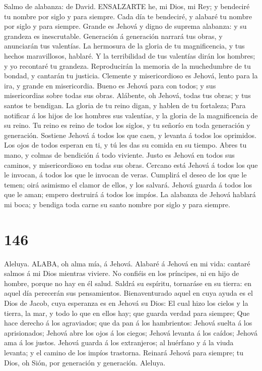  Salmo de alabanza: de David. ENSALZARTE he, mi Dios, mi
Rey; y bendeciré tu nombre por siglo y para siempre.  Cada
día te bendeciré, y alabaré tu nombre por siglo y para siempre.
 Grande es Jehová y digno de suprema alabanza: y su grandeza
es inescrutable.  Generación á generación narrará tus obras,
y anunciarán tus valentías.  La hermosura de la gloria de tu
magnificencia, y tus hechos maravillosos, hablaré.  Y la
terribilidad de tus valentías dirán los hombres; y yo recontaré tu
grandeza.  Reproducirán la memoria de la muchedumbre de tu
bondad, y cantarán tu justicia.  Clemente y misericordioso
es Jehová, lento para la ira, y grande en misericordia. 
Bueno es Jehová para con todos; y sus misericordias sobre todas sus
obras.  Alábente, oh Jehová, todas tus obras; y tus santos
te bendigan.  La gloria de tu reino digan, y hablen de tu
fortaleza;  Para notificar á los hijos de los hombres sus
valentías, y la gloria de la magnificencia de su reino.  Tu
reino es reino de todos los siglos, y tu señorío en toda generación y
generación.  Sostiene Jehová á todos los que caen, y
levanta á todos los oprimidos.  Los ojos de todos esperan
en ti, y tú les das su comida en su tiempo.  Abres tu mano,
y colmas de bendición á todo viviente.  Justo es Jehová en
todos sus caminos, y misericordioso en todas sus obras. 
Cercano está Jehová á todos los que le invocan, á todos los que le
invocan de veras.  Cumplirá el deseo de los que le temen;
oirá asimismo el clamor de ellos, y los salvará.  Jehová
guarda á todos los que le aman; empero destruirá á todos los impíos.
 La alabanza de Jehová hablará mi boca; y bendiga toda
carne su santo nombre por siglo y para siempre.

\hypertarget{section-145}{%
\section{146}\label{section-145}}

 Aleluya. ALABA, oh alma mía, á Jehová.  Alabaré
á Jehová en mi vida: cantaré salmos á mi Dios mientras viviere.
 No confiéis en los príncipes, ni en hijo de hombre, porque
no hay en él salud.  Saldrá su espíritu, tornaráse en su
tierra: en aquel día perecerán sus pensamientos. 
Bienaventurado aquel en cuya ayuda es el Dios de Jacob, cuya esperanza
es en Jehová su Dios:  El cual hizo los cielos y la tierra,
la mar, y todo lo que en ellos hay; que guarda verdad para siempre;
 Que hace derecho á los agraviados; que da pan á los
hambrientos: Jehová suelta á los aprisionados;  Jehová abre
los ojos á los ciegos; Jehová levanta á los caídos; Jehová ama á los
justos.  Jehová guarda á los extranjeros; al huérfano y á la
viuda levanta; y el camino de los impíos trastorna. 
Reinará Jehová para siempre; tu Dios, oh Sión, por generación y
generación. Aleluya.

